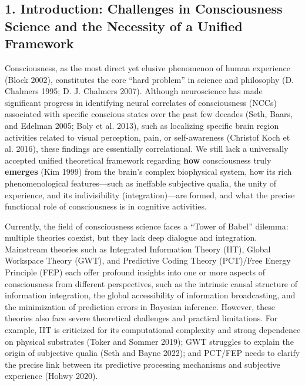 \documentclass[
  a4paper]{article}
\begin{document}
\subsection{1. Introduction: Challenges in Consciousness Science and the
Necessity of a Unified
Framework}\label{introduction-challenges-in-consciousness-science-and-the-necessity-of-a-unified-framework}

Consciousness, as the most direct yet elusive phenomenon of human
experience (Block 2002), constitutes the core ``hard problem'' in
science and philosophy (D. Chalmers 1995; D. J. Chalmers 2007). Although
neuroscience has made significant progress in identifying neural
correlates of consciousness (NCCs) associated with specific conscious
states over the past few decades (Seth, Baars, and Edelman 2005; Boly et
al. 2013), such as localizing specific brain region activities related
to visual perception, pain, or self-awareness (Christof Koch et al.
2016), these findings are essentially correlational. We still lack a
universally accepted unified theoretical framework regarding
\textbf{how} consciousness truly \textbf{emerges} (Kim 1999) from the
brain's complex biophysical system, how its rich phenomenological
features---such as ineffable subjective qualia, the unity of experience,
and its indivisibility (integration)---are formed, and what the precise
functional role of consciousness is in cognitive activities.

Currently, the field of consciousness science faces a ``Tower of Babel''
dilemma: multiple theories coexist, but they lack deep dialogue and
integration. Mainstream theories such as Integrated Information Theory
(IIT), Global Workspace Theory (GWT), and Predictive Coding Theory
(PCT)/Free Energy Principle (FEP) each offer profound insights into one
or more aspects of consciousness from different perspectives, such as
the intrinsic causal structure of information integration, the global
accessibility of information broadcasting, and the minimization of
prediction errors in Bayesian inference. However, these theories also
face severe theoretical challenges and practical limitations. For
example, IIT is criticized for its computational complexity and strong
dependence on physical substrates (Toker and Sommer 2019); GWT struggles
to explain the origin of subjective qualia (Seth and Bayne 2022); and
PCT/FEP needs to clarify the precise link between its predictive
processing mechanisms and subjective experience (Hohwy 2020).
\end{document}
